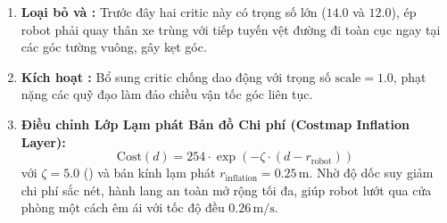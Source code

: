 \begin{enumerate}
    \item \textbf{Loại bỏ  và :} Trước đây hai critic này có trọng số lớn ($14.0$ và $12.0$), ép robot phải quay thân xe trùng với tiếp tuyến vệt đường đi toàn cục ngay tại các góc tường vuông, gây kẹt góc.
    \item \textbf{Kích hoạt :} Bổ sung critic chống dao động với trọng số $\text{scale} = 1.0$, phạt nặng các quỹ đạo làm đảo chiều vận tốc góc liên tục.
    \item \textbf{Điều chỉnh Lớp Lạm phát Bản đồ Chi phí (Costmap Inflation Layer):}
    \begin{equation}
    \text{Cost}(d) = 254 \cdot \exp\left(-\zeta \cdot (d - r_{\text{robot}})\right)
    \end{equation}
    với $\zeta = 5.0$ () và bán kính lạm phát $r_{\text{inflation}} = 0.25\,\text{m}$. Nhờ độ dốc suy giảm chi phí sắc nét, hành lang an toàn mở rộng tối đa, giúp robot lướt qua cửa phòng một cách êm ái với tốc độ đều $0.26\,\text{m/s}$.
\end{enumerate}
